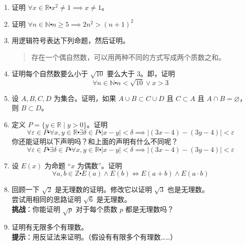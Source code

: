 \begin{enumerate}[label=(\arabic*)]
    \item 证明 $\forall x \in \mathbb{R} \centerdot x^2 \ne 1 \implies x \ne 1$。
    \item 证明 $\forall n \in \mathbb{N} \centerdot n \ge 5 \implies 2n^2 > (n+1)^2$ \label{exc:exercises4.9.2}
    \item 用逻辑符号表达下列命题，然后证明。
        \begin{quote}
            存在一个偶自然数，可以用两种不同的方式写成两个质数之和。
        \end{quote}
    \item 证明每个自然数要么小于 $\sqrt{10}$ 要么大于 $3$。即，证明
        \[\forall n \in \mathbb{N} \centerdot n<\sqrt{10} \lor x>3\]
    \item 设 $A,B,C,D$ 为集合。证明，如果 $A \cup B \subset C \cup D$ 且 $C \subset A$ 且 $A \cap B = \varnothing$，则 $B \subset D$。
    \item 定义 $P = \{y \in \mathbb{R} \mid y > 0\}$。证明
        \[\forall \varepsilon \in P \centerdot \forall x, y \in \mathbb{R} \centerdot \exists \delta \in P \centerdot |x - y| < \delta \implies |(3x - 4) - (3y - 4)| < \varepsilon\]
        你还能证明以下声明吗？和上面的声明有什么不同呢？
        \[\forall \varepsilon \in P \centerdot \exists \delta \in P \centerdot \forall x, y \in \mathbb{R} \centerdot  |x - y| < \delta \implies |(3x - 4) - (3y - 4)| < \varepsilon\]
    \item 设 $E(x)$ 为命题 ``$x$ 为偶数''。证明
        \[\forall a, b \in \mathbb{Z} \centerdot E(a) \land E(b) \iff E(a + b) \land E(a \cdot b)\]
    \item 回顾一下 $\sqrt{2}$ 是无理数的证明。修改它以证明 $\sqrt{3}$ 也是无理数。\\
        尝试用相同的思路证明 $\sqrt{6}$ 是无理数。\\
        \textbf{挑战}：你能证明 $\sqrt{p}$ 对于每个质数 $p$ 都是无理数吗？
    \item 证明有无限多个有理数。\\
        \textbf{提示}：用反证法来证明。（假设有有限多个有理数……）
\end{enumerate}